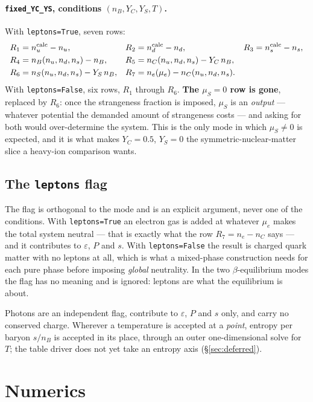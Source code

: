 \documentclass[aps,prc,onecolumn,superscriptaddress,nofootinbib,10pt]{revtex4-2}
\newcommand{\nB}{n_B}
\newcommand{\nC}{n_C}
\newcommand{\nS}{n_S}
\newcommand{\muS}{\mu_S}
\begin{document}
\paragraph{\texttt{fixed\_YC\_YS}, conditions $(\nB, Y_C, Y_S, T)$.} With
\texttt{leptons=True}, seven rows:
%
\begin{align}
R_1 &= n_u^{\rm calc} - n_u , &
R_2 &= n_d^{\rm calc} - n_d , &
R_3 &= n_s^{\rm calc} - n_s , \notag \\
R_4 &= \nB(n_u,n_d,n_s) - \nB , &
R_5 &= \nC(n_u,n_d,n_s) - Y_C\, \nB , \notag \\
R_6 &= \nS(n_u,n_d,n_s) - Y_S\, \nB , &
R_7 &= n_e(\mu_e) - \nC(n_u,n_d,n_s) . &&
\label{eq:res:ycys}
\end{align}
%
With \texttt{leptons=False}, six rows, $R_1$ through $R_6$. \textbf{The
$\muS = 0$ row is gone}, replaced by $R_6$: once the strangeness fraction is
imposed, $\muS$ is an \emph{output} --- whatever potential the demanded amount
of strangeness costs --- and asking for both would over-determine the system.
This is the only mode in which $\muS \neq 0$ is expected, and it is what makes
$Y_C = 0.5$, $Y_S = 0$ the symmetric-nuclear-matter slice a heavy-ion
comparison wants.

\subsection{The \texttt{leptons} flag}

The flag is orthogonal to the mode and is an explicit argument, never one of
the conditions. With \texttt{leptons=True} an electron gas is added at
whatever $\mu_e$ makes the total system neutral --- that is exactly what the
row $R_7 = n_e - \nC$ says --- and it contributes to $\varepsilon$, $P$ and
$s$. With \texttt{leptons=False} the result is charged quark matter with no
leptons at all, which is what a mixed-phase construction needs for each pure
phase before imposing \emph{global} neutrality. In the two
$\beta$-equilibrium modes the flag has no meaning and is ignored: leptons are
what the equilibrium is about.

Photons are an independent flag, contribute to $\varepsilon$, $P$ and $s$
only, and carry no conserved charge. Wherever a temperature is accepted at a
\emph{point}, entropy per baryon $s/\nB$ is accepted in its place, through an
outer one-dimensional solve for $T$; the table driver does not yet take an
entropy axis (\S\ref{sec:deferred}).

\section{Numerics}
\label{sec:numerics}
\end{document}
